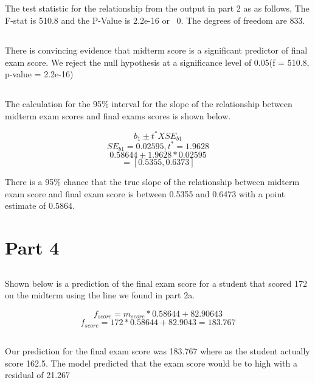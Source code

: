 \documentclass[letterpaper, onecolumn,10pt]{IEEEtran}
\begin{document}
            \subsection{}
            The test statistic for the relationship from the output in part 2 as as follows, The F-stat is 510.8 and the P-Value is 2.2e-16 or ~0. The degrees of freedom are 833.\\
            
            \subsection{}
            There is convincing evidence that midterm score is a significant predictor of final exam score. We reject the null hypothesis at a significance level of 0.05(f = 510.8, p-value = 2.2e-16)\\
            
            \subsection{}
            The calculation for the 95\% interval for the slope of the relationship between midterm exam scores and final exams scores is shown below.
            
            \[b_1 \pm t^*XSE_{b1}\]
            \[SE_{b1} = 0.02595, t^* = 1.9628\]
            \[ 0.58644 \pm 1.9628*0.02595\]
            \[= [0.5355, 0.6373]\]
            
            There is a 95\% chance that the true slope of the relationship between midterm exam score and final exam score is between 0.5355 and 0.6473 with a point estimate of 0.5864.\\
        \section{Part 4}
            \subsection{}
            Shown below is a prediction of the final exam score for a student that scored 172 on the midterm using the line we found in part 2a.
            
            \[f_{score} = m_{score}*0.58644 + 82.90643\]
            \[f_{score} = 172*0.58644 + 82.9043 = 183.767\]
            
            \subsection{}
            Our prediction for the final exam score was 183.767 where as the student actually score 162.5. The model predicted that the exam score would be to high with a residual of 21.267\\
            
\end{document}
